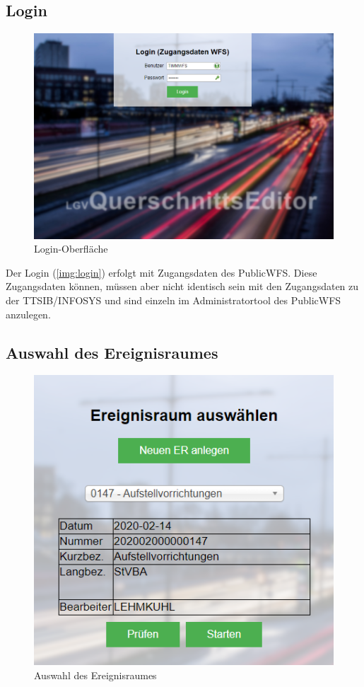 \documentclass[a4paper,11pt,bibliography=totoc, listof=totoc,titlepage]{scrartcl}
\begin{document}
\subsection{Login}
\begin{figure}
 \centering
 \includegraphics[width=.8\textwidth]{./img/login.png}
 \caption{Login-Oberfläche}
 \label{img:login}
\end{figure}

\label{ss:login}
Der Login (\autoref{img:login}) erfolgt mit Zugangsdaten des PublicWFS. Diese Zugangsdaten können, müssen aber nicht identisch sein mit den Zugangsdaten zu der TTSIB/INFOSYS und sind einzeln im Administratortool des PublicWFS anzulegen. 



\subsection{Auswahl des Ereignisraumes}

\begin{figure}
 \centering
 \includegraphics[width=.7\textwidth]{./img/er_auswahl.png}
 \caption{Auswahl des Ereignisraumes}
 \label{img:er_auswahl}
\end{figure}
\end{document}

